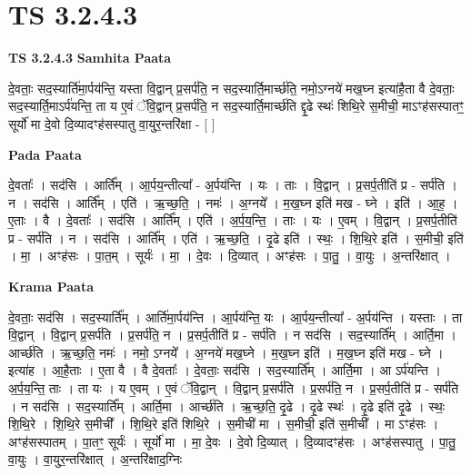 \documentclass[17pt]{extarticle}
\begin{document}

\section{ TS 3.2.4.3 }

\textbf{TS 3.2.4.3 } \newline
\textbf{Samhita Paata} \newline

दे॒वताः॒ सद॒स्यार्ति॑मा॒र्पय॑न्ति॒ यस्ता वि॒द्वान् प्र॒सर्प॑ति॒ न सद॒स्यार्ति॒मार्च्छ॑ति॒ नमो॒ऽग्नये॑ मख॒घ्न इत्या॑है॒ता वै दे॒वताः॒ सद॒स्यार्ति॒माऽर्प॑यन्ति॒ ता य ए॒वं ॅवि॒द्वान् प्र॒सर्प॑ति॒ न सद॒स्यार्ति॒मार्च्छ॑ति द्दृ॒ढे स्थः॑ शिथि॒रे स॒मीची॒ माऽꣳह॑सस्पातꣳ॒॒ सूर्यो॑ मा दे॒वो दि॒व्यादꣳह॑सस्पातु वा॒युर॒न्तरि॑क्षा - [  ] \newline

\textbf{Pada Paata} \newline

दे॒वताः᳚ । सद॑सि । आर्ति᳚म् । आ॒र्पय॒न्तीत्या᳚ - अ॒र्पय॑न्ति । यः । ताः । वि॒द्वान् । प्र॒सर्प॒तीति॑ प्र - सर्प॑ति । न । सद॑सि । आर्ति᳚म् । एति॑ । ऋ॒च्छ॒ति॒ । नमः॑ । अ॒ग्नये᳚ । म॒ख॒घ्न इति॑ मख - घ्ने । इति॑ । आ॒ह॒ । ए॒ताः । वै । दे॒वताः᳚ । सद॑सि । आर्ति᳚म् । एति॑ । अ॒र्प॒य॒न्ति॒ । ताः । यः । ए॒वम् । वि॒द्वान् । प्र॒सर्प॒तीति॑ प्र - सर्प॑ति । न । सद॑सि । आर्ति᳚म् । एति॑ । ऋ॒च्छ॒ति॒ । दृ॒ढे इति॑ । स्थः॒ । शि॒थि॒रे इति॑ । स॒मीची॒ इति॑ । मा॒ । अꣳह॑सः । पा॒त॒म् । सूर्यः॑ । मा॒ । दे॒वः । दि॒व्यात् । अꣳह॑सः । पा॒तु॒ । वा॒युः । अ॒न्तरि॑क्षात् ।  \newline


\textbf{Krama Paata} \newline

दे॒वताः॒ सद॑सि । सद॒स्यार्ति᳚म् । आर्ति॑मा॒र्पय॑न्ति । आ॒र्पय॑न्ति॒ यः । आ॒र्पय॒न्तीत्या᳚ - अ॒र्पय॑न्ति । यस्ताः । ता वि॒द्वान् । वि॒द्वान् प्र॒सर्प॑ति । प्र॒सर्प॑ति॒ न । प्र॒सर्प॒तीति॑ प्र - सर्प॑ति । न सद॑सि । सद॒स्यार्ति᳚म् । आर्ति॒मा । आर्च्छ॑ति । ऋ॒च्छ॒ति॒ नमः॑ । नमो॒ ऽग्नये᳚ । अ॒ग्नये॑ मख॒घ्ने । म॒ख॒घ्न इति॑ । म॒ख॒घ्न इति॑ मख - घ्ने । इत्या॑ह । आ॒है॒ताः । ए॒ता वै । वै दे॒वताः᳚ । दे॒वताः॒ सद॑सि । सद॒स्यार्ति᳚म् । आर्ति॒मा । आ ऽर्प॑यन्ति । अ॒र्प॒य॒न्ति॒ ताः । ता यः । य ए॒वम् । ए॒वं ॅवि॒द्वान् । वि॒द्वान् प्र॒सर्प॑ति । प्र॒सर्प॑ति॒ न । प्र॒सर्प॒तीति॑ प्र - सर्प॑ति । न सद॑सि । सद॒स्यार्ति᳚म् । आर्ति॒मा । आर्च्छ॑ति । ऋ॒च्छ॒ति॒ दृ॒ढे । दृ॒ढे स्थः॑ । दृ॒ढे इति॑ दृ॒ढे । स्थः॒ शि॒थि॒रे । शि॒थि॒रे स॒मीची᳚ । शि॒थि॒रे इति॑ शिथि॒रे । स॒मीची॑ मा । स॒मीची॒ इति॑ स॒मीची᳚ । मा ऽꣳह॑सः । अꣳह॑सस्पातम् । पा॒तꣳ॒॒ सूर्यः॑ । सूर्यो॑ मा । मा॒ दे॒वः । दे॒वो दि॒व्यात् । दि॒व्यादꣳह॑सः । अꣳह॑सस्पातु । पा॒तु॒ वा॒युः । वा॒युर॒न्तरि॑क्षात् । अ॒न्तरि॑क्षाद॒ग्निः \newline
\end{document}
